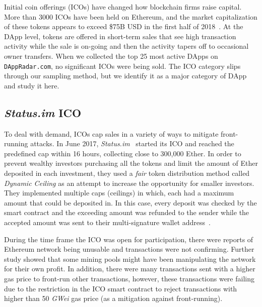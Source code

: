 Initial coin offerings (ICOs) have changed how blockchain firms raise capital. More than 3000 ICOs have been held on Ethereum, and the market capitalization of these tokens appears to exceed \$75B USD in the first half of 2018~\cite{zetzsche2018ico}. At the DApp level, tokens are offered in short-term sales that see high transaction activity while the sale is on-going and then the activity tapers off to occasional owner transfers. When we collected the top 25 most active DApps on \texttt{DAppRadar.com}, no significant ICOs were being sold. The ICO category slips through our sampling method, but we identify it as a major category of DApp and study it here.

\subsection{\textit{Status.im} ICO}
To deal with demand, ICOs cap sales in a variety of ways to mitigate front-running attacks. In June 2017, \textit{Status.im}~\cite{statuswhitepaper} started its ICO and reached the predefined cap within 16 hours, collecting close to 300,000 Ether. In order to prevent wealthy investors purchasing all the tokens and limit the amount of Ether deposited in each investment, they used a \textit{fair} token distribution method called \textit{Dynamic Ceiling} as an attempt to increase the opportunity for smaller investors. They implemented multiple caps (ceilings) in which, each had a maximum amount that could be deposited in. In this case, every deposit was checked by the smart contract and the exceeding amount was refunded to the sender while the accepted amount was sent to their multi-signature wallet address~\cite{statusicoanalysis}.

During the time frame the ICO was open for participation, there were reports of Ethereum network being unusable and transactions were not confirming. Further study showed that some mining pools might have been manipulating the network for their own profit. In addition, there were many transactions sent with a higher gas price to front-run other transactions, however, these transactions were failing due to the restriction in the ICO smart contract to reject transactions with higher than 50 \textit{GWei} gas price (as a mitigation against front-running).


